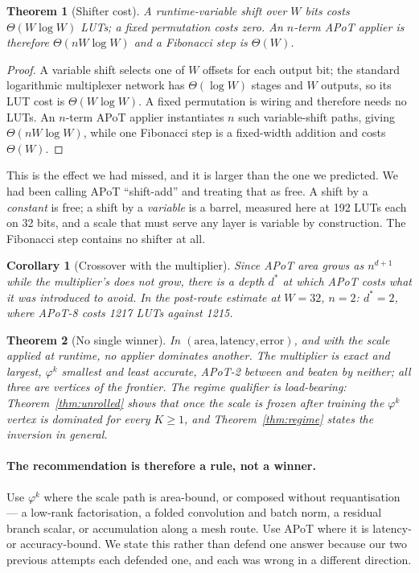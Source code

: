 \documentclass[11pt]{article}
\newtheorem{theorem}{Theorem}
\newtheorem{corollary}{Corollary}
\theoremstyle{definition}
\begin{document}
\begin{theorem}[Shifter cost]
\label{thm:shifter}
A runtime-variable shift over $W$ bits costs $\Theta(W\log W)$ LUTs; a fixed
permutation costs zero. An $n$-term APoT applier is therefore
$\Theta(nW\log W)$ and a Fibonacci step is $\Theta(W)$.
\end{theorem}
\begin{proof}
A variable shift selects one of $W$ offsets for each output bit; the standard
logarithmic multiplexer network has $\Theta(\log W)$ stages and $W$ outputs,
so its LUT cost is $\Theta(W\log W)$.  A fixed permutation is wiring and
therefore needs no LUTs.  An $n$-term APoT applier instantiates $n$ such
variable-shift paths, giving $\Theta(nW\log W)$, while one Fibonacci step
is a fixed-width addition and costs $\Theta(W)$.
\end{proof}

This is the effect we had missed, and it is larger than the one we predicted. We
had been calling APoT ``shift-add'' and treating that as free. A shift by a
\emph{constant} is free; a shift by a \emph{variable} is a barrel, measured here
at 192 LUTs each on 32 bits, and a scale that must serve any layer is variable by
construction. The Fibonacci step contains no shifter at all.

\begin{corollary}[Crossover with the multiplier]
\label{cor:crossover}
Since APoT area grows as $n^{d+1}$ while the multiplier's does not grow, there is
a depth $d^{*}$ at which APoT costs what it was introduced to avoid. In the post-route estimate at
$W=32$, $n=2$: $d^{*}=2$, where APoT-8 costs 1217 LUTs against 1215.
\end{corollary}

\begin{theorem}[No single winner]
\label{thm:threevertex}
In $(\text{area}, \text{latency}, \text{error})$, and with the scale applied at
runtime, no applier dominates another. The multiplier is exact and largest,
$\varphi^{k}$ smallest and least accurate, APoT-2 between and beaten by neither;
all three are vertices of the frontier. The regime qualifier is load-bearing:
Theorem~\ref{thm:unrolled} shows that once the scale is frozen after training the
$\varphi^{k}$ vertex is dominated for every $K \geq 1$, and
Theorem~\ref{thm:regime} states the inversion in general.
\end{theorem}

\paragraph{The recommendation is therefore a rule, not a winner.} Use
$\varphi^{k}$ where the scale path is area-bound, or composed without
requantisation --- a low-rank factorisation, a folded convolution and batch norm,
a residual branch scalar, or accumulation along a mesh route. Use APoT where it is
latency- or accuracy-bound. We state this rather than defend one answer because
our two previous attempts each defended one, and each was wrong in a different
direction.
\end{document}
